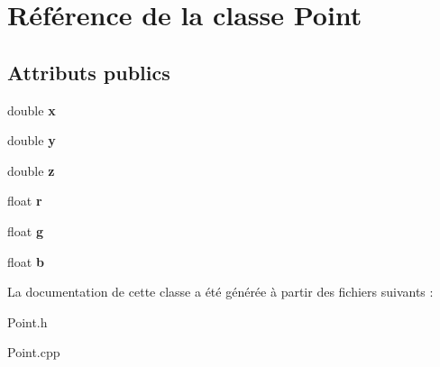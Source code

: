 \hypertarget{class_point}{}\section{Référence de la classe Point}
\label{class_point}
\subsection*{Attributs publics}
\begin{DoxyCompactItemize}
\item 
\mbox{\label{class_point_ab99c56589bc8ad5fa5071387110a5bc7}} 
double {\bfseries x}
\item 
\mbox{\label{class_point_afa38be143ae800e6ad69ce8ed4df62d8}} 
double {\bfseries y}
\item 
\mbox{\label{class_point_a05ba3b1dfcb19430582ae953cbbfbded}} 
double {\bfseries z}
\item 
\mbox{\label{class_point_ae8c8d56470813935035a73cf78230458}} 
float {\bfseries r}
\item 
\mbox{\label{class_point_a88ba0261573bb044453db04bf2f7c54d}} 
float {\bfseries g}
\item 
\mbox{\label{class_point_a4927e16e748894280c1df42b8a80e410}} 
float {\bfseries b}
\end{DoxyCompactItemize}


La documentation de cette classe a été générée à partir des fichiers suivants \+:\begin{DoxyCompactItemize}
\item 
Point.\+h\item 
Point.\+cpp\end{DoxyCompactItemize}
